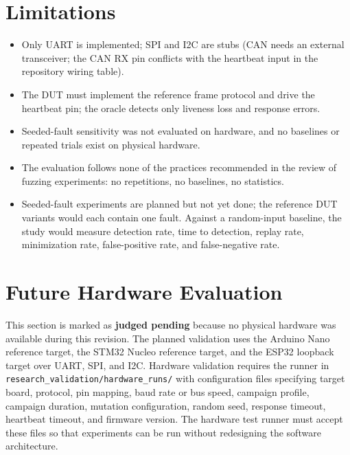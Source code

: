 \documentclass[10pt,letterpaper]{article}
\begin{document}
\section{Limitations}
\begin{itemize}
  \item Only UART is implemented; SPI and I2C are stubs (CAN needs an external transceiver; the CAN RX pin conflicts with the heartbeat input in the repository wiring table).
  \item The DUT must implement the reference frame protocol and drive the heartbeat pin; the oracle detects only liveness loss and response errors.
  \item Seeded-fault sensitivity was not evaluated on hardware, and no baselines or repeated trials exist on physical hardware.
  \item The evaluation follows none of the practices recommended in the review of fuzzing experiments: no repetitions, no baselines, no statistics.
  \item Seeded-fault experiments are planned but not yet done; the reference DUT variants would each contain one fault. Against a random-input baseline, the study would measure detection rate, time to detection, replay rate, minimization rate, false-positive rate, and false-negative rate.
\end{itemize}

\section{Future Hardware Evaluation}
This section is marked as \textbf{judged pending} because no physical hardware was available during this revision. The planned validation uses the Arduino Nano reference target, the STM32 Nucleo reference target, and the ESP32 loopback target over UART, SPI, and I2C. Hardware validation requires the runner in \verb|research_validation/hardware_runs/| with configuration files specifying target board, protocol, pin mapping, baud rate or bus speed, campaign profile, campaign duration, mutation configuration, random seed, response timeout, heartbeat timeout, and firmware version. The hardware test runner must accept these files so that experiments can be run without redesigning the software architecture.
\end{document}
